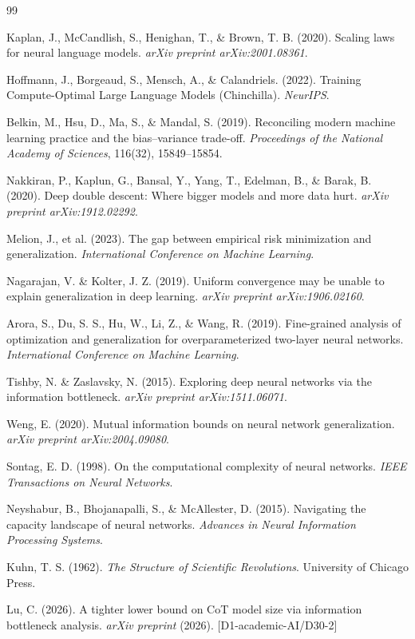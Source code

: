 \documentclass[12pt]{article}
\theoremstyle{definition}
\theoremstyle{remark}
\begin{document}

\begin{thebibliography}{99}

Kaplan, J., McCandlish, S., Henighan, T., \& Brown, T. B. (2020).
Scaling laws for neural language models.
\textit{arXiv preprint arXiv:2001.08361}.

Hoffmann, J., Borgeaud, S., Mensch, A., \& Calandriels. (2022).
Training Compute-Optimal Large Language Models (Chinchilla).
\textit{NeurIPS}.

Belkin, M., Hsu, D., Ma, S., \& Mandal, S. (2019).
Reconciling modern machine learning practice and the bias--variance trade-off.
\textit{Proceedings of the National Academy of Sciences}, 116(32), 15849--15854.

Nakkiran, P., Kaplun, G., Bansal, Y., Yang, T., Edelman, B., \& Barak, B. (2020).
Deep double descent: Where bigger models and more data hurt.
\textit{arXiv preprint arXiv:1912.02292}.

Melion, J., et al. (2023).
The gap between empirical risk minimization and generalization.
\textit{International Conference on Machine Learning}.

Nagarajan, V. \& Kolter, J. Z. (2019).
Uniform convergence may be unable to explain generalization in deep learning.
\textit{arXiv preprint arXiv:1906.02160}.

Arora, S., Du, S. S., Hu, W., Li, Z., \& Wang, R. (2019).
Fine-grained analysis of optimization and generalization for overparameterized two-layer neural networks.
\textit{International Conference on Machine Learning}.

Tishby, N. \& Zaslavsky, N. (2015).
Exploring deep neural networks via the information bottleneck.
\textit{arXiv preprint arXiv:1511.06071}.

Weng, E. (2020).
Mutual information bounds on neural network generalization.
\textit{arXiv preprint arXiv:2004.09080}.

Sontag, E. D. (1998).
On the computational complexity of neural networks.
\textit{IEEE Transactions on Neural Networks}.

Neyshabur, B., Bhojanapalli, S., \& McAllester, D. (2015).
Navigating the capacity landscape of neural networks.
\textit{Advances in Neural Information Processing Systems}.

Kuhn, T. S. (1962).
\textit{The Structure of Scientific Revolutions}.
University of Chicago Press.

Lu, C. (2026).
A tighter lower bound on CoT model size via information bottleneck analysis.
\textit{arXiv preprint} (2026). [D1-academic-AI/D30-2]

\end{thebibliography}
\end{document}
